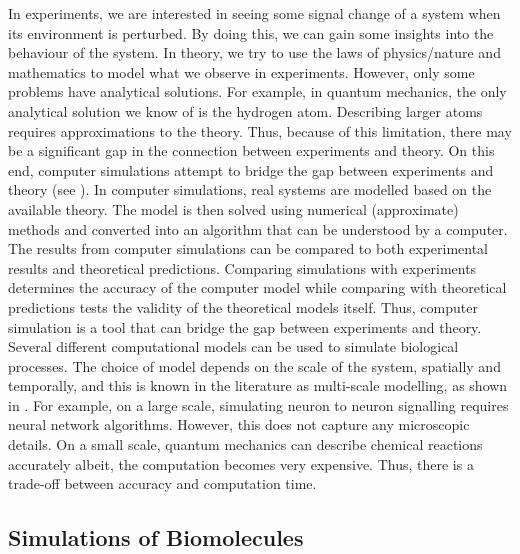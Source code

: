 In experiments, we are interested in seeing some signal change of a system when its 
environment is perturbed. By doing this, we can gain some insights into the behaviour of 
the system. In theory, we try to use the laws of physics/nature and mathematics to model 
what we observe in experiments. However, only some problems have analytical solutions. 
For example, in quantum mechanics, the only analytical solution we know of is the hydrogen 
atom. Describing larger atoms requires approximations to the theory. Thus, because of this 
limitation, there may be a significant gap in the connection between experiments and theory. 
On this end, computer simulations attempt to bridge the gap between experiments and theory 
(see ). In computer simulations, real systems are modelled based on the 
available theory. The model is then solved using numerical (approximate) methods and converted 
into an algorithm that can be understood by a computer. The results from computer simulations 
can be compared to both experimental results and theoretical predictions. Comparing 
simulations with experiments determines the accuracy of the computer model while comparing 
with theoretical predictions tests the validity of the theoretical models itself. Thus, 
computer simulation is a tool that can bridge the gap between experiments and theory. Several 
different computational models can be used to simulate biological processes. 
The choice of model depends on the scale of the system, spatially and temporally, and this is 
known in the literature as multi-scale modelling, as shown in . For example, 
on a large scale, simulating neuron to neuron signalling requires neural network algorithms. 
However, this does not capture any microscopic details. On a small scale, quantum mechanics 
can describe chemical reactions accurately albeit, the computation becomes very expensive. 
Thus, there is a trade-off between accuracy and computation time.

\subsection{Simulations of Biomolecules}

\vskip 0.5cm

